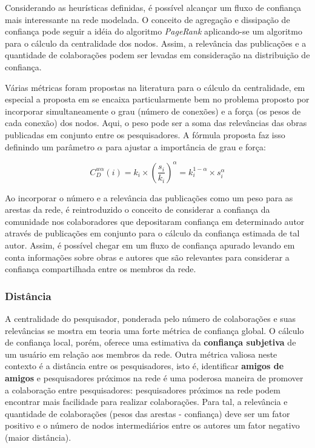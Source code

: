 \documentclass[12pt]{article}
\begin{document}
Considerando as heurísticas definidas, é possível alcançar um fluxo de confiança mais interessante na rede modelada. O conceito 
de agregação e dissipação de confiança pode seguir a idéia do algoritmo \textit{PageRank} aplicando-se um algoritmo para o 
cálculo da centralidade dos nodos. Assim, a relevância das publicações e a quantidade de colaborações podem ser levadas em 
consideração na distribuição de confiança.

Várias métricas foram propostas na literatura para o cálculo da centralidade, em especial a proposta em \cite{opsahl2010node} 
se encaixa particularmente bem no problema proposto por incorporar simultaneamente o grau (número de conexões) e a força 
(os pesos de cada conexão) dos nodos. Aqui, o peso pode ser a soma das relevâncias das obras publicadas em conjunto entre os 
pesquisadores. A fórmula proposta faz isso definindo um parâmetro $\alpha$ para ajustar a importância de grau e força:

\begin{equation} \label{eqn:centrality} 
 C_D ^{w \alpha} (i) = k_i \times \left( \frac {s_i} {k_i} \right) ^{\alpha} = k_i ^{1 - \alpha} \times s _i ^{\alpha}
\end{equation}

Ao incorporar o número e a relevância das publicações como um peso para as arestas da rede, é reintroduzido o conceito de 
considerar a confiança da comunidade nos colaboradores que depositaram confiança em determinado autor através de publicações 
em  conjunto para o cálculo da confiança estimada de tal autor. Assim, é possível chegar em um fluxo de confiança apurado 
levando em conta informações sobre obras e autores que são relevantes para considerar a confiança compartilhada entre 
os membros da rede.

\subsubsection{Distância}

A centralidade do pesquisador, ponderada pelo número de colaborações e suas relevâncias se mostra em teoria uma forte métrica de 
confiança global. O cálculo de confiança local, porém, oferece uma estimativa da \textbf{confiança subjetiva} de um usuário em 
relação aos membros da rede. Outra métrica valiosa neste contexto é a distância entre  os pesquisadores, isto é, identificar 
\textbf{amigos de amigos} e pesquisadores próximos na rede é uma poderosa maneira de promover a colaboração entre pesquisadores: 
pesquisadores próximos na rede podem encontrar mais facilidade para realizar colaborações. Para tal, a relevância e quantidade de 
colaborações (pesos das arestas - confiança) deve ser um fator positivo e o número de nodos intermediários entre os autores um 
fator negativo (maior distância).
\end{document}
